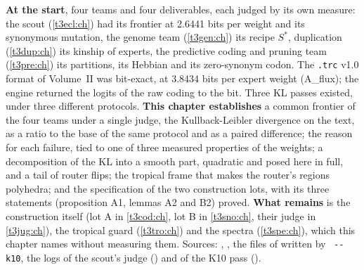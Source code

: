 \begin{origine}
\textbf{At the start}, four teams and four deliverables, each judged by its own measure: the scout (\cref{t3ecl:ch}) had its frontier at \num{2.6441} bits per weight and its synonymous mutation, the genome team (\cref{t3gen:ch}) its recipe $S^{*}$, duplication (\cref{t3dup:ch}) its kinship of experts, the predictive coding and pruning team (\cref{t3pre:ch}) its partitions, its Hebbian and its zero-synonym codon. The \texttt{.trc} v1.0 format of Volume~II was bit-exact, at \num{3.8434} bits per expert weight (A\_flux); the engine returned the logits of the raw coding to the bit. Three KL passes existed, under three different protocols.
\textbf{This chapter establishes} a common frontier of the four teams under a single judge, the Kullback-Leibler divergence on the text, as a ratio to the base of the same protocol and as a paired difference; the reason for each failure, tied to one of three measured properties of the weights; a decomposition of the KL into a smooth part, quadratic and posed here in full, and a tail of router flips; the tropical frame that makes the router's regions polyhedra; and the specification of the two construction lots, with its three statements (proposition A1, lemmas A2 and B2) proved.
\textbf{What remains} is the construction itself (lot A in \cref{t3cod:ch}, lot B in \cref{t3sno:ch}, their judge in \cref{t3jug:ch}), the tropical guard (\cref{t3tro:ch}) and the spectra (\cref{t3spe:ch}), which this chapter names without measuring them.
Sources: , , the files of  written by ~\texttt{-{}-k10}, the logs of the scout's judge () and of the K10 pass ().
\end{origine}

